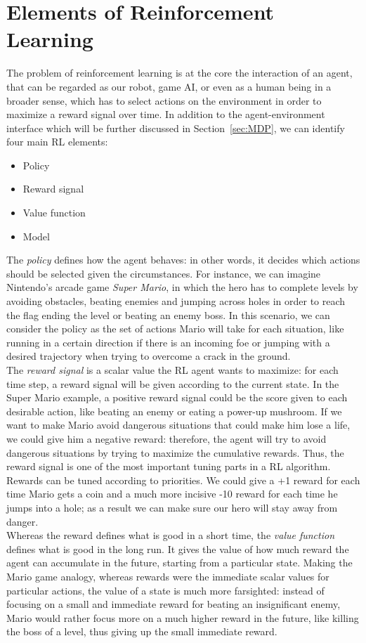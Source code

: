 \section{Elements of Reinforcement Learning} 
\label{sec:elementsRL}
The problem of reinforcement learning is at the core the interaction of an agent, that can be regarded as our robot, game AI, or even as a human being in a broader sense, which has to select actions on the environment in order to maximize a reward signal over time. In addition to the agent-environment interface which will be further discussed in Section~\ref{sec:MDP}, we can identify four main RL elements:
\begin{itemize}
	\item Policy
	\item Reward signal
	\item Value function
	\item Model
\end{itemize}
\indent The \textit{policy} defines how the agent behaves: in other words, it decides which actions should be selected given the circumstances. For instance, we can imagine Nintendo's arcade game \textit{Super Mario}, in which the hero has to complete levels by avoiding obstacles, beating enemies and jumping across holes in order to reach the flag ending the level or beating an enemy boss. In this scenario, we can consider the policy as the set of actions Mario will take for each situation, like running in a certain direction if there is an incoming foe or jumping with a desired trajectory when trying to overcome a crack in the ground.
\\
\indent The \textit{reward signal} is a scalar value the RL agent wants to maximize: for each time step, a reward signal will be given according to the current state. In the Super Mario example, a positive reward signal could be the score given to each desirable action, like beating an enemy or eating a power-up mushroom. If we want to make Mario avoid dangerous situations that could make him lose a life, we could give him a negative reward: therefore, the agent will try to avoid dangerous situations by trying to maximize the cumulative rewards. Thus, the reward signal is one of the most important tuning parts in a RL algorithm. Rewards can be tuned according to priorities. We could give a +1 reward for each time Mario gets a coin and a much more incisive -10 reward for each time he jumps into a hole; as a result we can make sure our hero will stay away from danger.
\\
\indent Whereas the reward defines what is good in a short time, the \textit{value function} defines what is good in the long run. It gives the value of how much reward the agent can accumulate in the future, starting from a particular state. Making the Mario game analogy, whereas rewards were the immediate scalar values for particular actions, the value of a state is much more farsighted: instead of focusing on a small and immediate reward for beating an insignificant enemy, Mario would rather focus more on a much higher reward in the future, like killing the boss of a level, thus giving up the small immediate reward.
